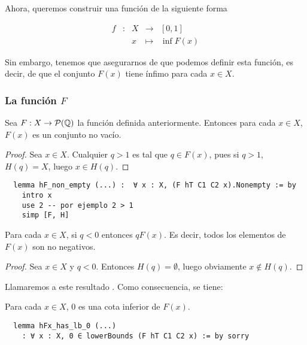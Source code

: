 Ahora, queremos construir una función de la siguiente forma

$$
\begin{array}{rcrcl}
  f & : & X & \longrightarrow & [0, 1] \\
    & & x & \longmapsto & \inf F(x)
\end{array}
$$

Sin embargo, tenemos que asegurarnos de que podemos definir esta función, es decir, de que el conjunto $F(x)$ tiene ínfimo para cada $x \in X$.

\subsubsection{La función $F$}

\begin{lemma}
  Sea $F :  X  \to \mathcal{P}(\mathbb{Q})$ la función definida anteriormente. Entonces para cada $x \in X$, $F(x)$ es un conjunto no vacío.
\end{lemma}

\begin{proof}
  Sea $x \in X$. Cualquier $q > 1$ es tal que $q \in F(x)$, pues si $q >1$, $H(q) = X$, luego $x \in H(q)$.
\end{proof}

\begin{lstlisting}
  lemma hF_non_empty (...) :  ∀ x : X, (F hT C1 C2 x).Nonempty := by
    intro x
    use 2 -- por ejemplo 2 > 1
    simp [F, H]
\end{lstlisting}

\begin{lemma}
  Para cada $x \in X$, si $q < 0$ entonces $q  F(x)$. Es decir, todos los elementos de $F(x)$ son no negativos.
\end{lemma}

\begin{proof}
  Sea $x \in X$ y $q < 0$. Entonces $H(q) = \emptyset$, luego obviamente $x \notin H(q)$.
\end{proof}

Llamaremos a este resultado . Como consecuencia, se tiene:

\begin{lemma}
  Para cada $x \in X$, $0$ es una cota inferior de $F(x)$.
\end{lemma}

\begin{lstlisting}
  lemma hFx_has_lb_0 (...)
    : ∀ x : X, 0 ∈ lowerBounds (F hT C1 C2 x) := by sorry
\end{lstlisting}

